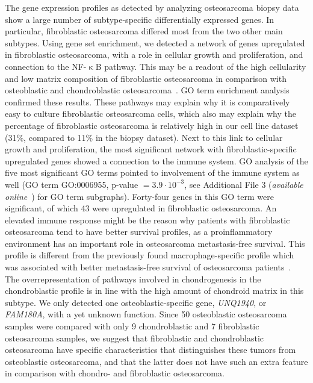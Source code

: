 The gene expression profiles as detected by analyzing
osteosarcoma biopsy data show a large number of subtype\hyp{}specific differentially expressed genes. In particular,
fibroblastic osteosarcoma differed most from the two
other main subtypes. Using gene set enrichment, we
detected a network of genes upregulated in fibroblastic
osteosarcoma, with a role in cellular growth and proliferation,
and connection to the NF-$\upkappa$B pathway. This
may be a readout of the high cellularity and low matrix
composition of fibroblastic osteosarcoma in comparison
with osteoblastic and chondroblastic osteosarcoma~\cite{raymond2002conventional}.
GO term enrichment analysis confirmed these results.
These pathways may explain why it is comparatively
easy to culture fibroblastic osteosarcoma cells, which
also may explain why the percentage of fibroblastic
osteosarcoma is relatively high in our cell line dataset
(31\%, compared to 11\% in the biopsy dataset). Next to
this link to cellular growth and proliferation, the most
significant network with fibroblastic\hyp{}specific upregulated
genes showed a connection to the immune system. GO
analysis of the five most significant GO terms pointed
to involvement of the immune system as well (GO term
GO:0006955, p-value $=3.9\cdot10^{-3}$, see Additional File 3 ({\it available online}~\cite{ch3additional}) for GO
term subgraphs). Forty\hyp{}four genes in this GO term were
significant, of which 43 were upregulated in fibroblastic
osteosarcoma. An elevated immune response might be
the reason why patients with fibroblastic osteosarcoma
tend to have better survival profiles, as a proinflammatory
environment has an important role in osteosarcoma
metastasis\hyp{}free survival. This profile is different from the
previously found macrophage\hyp{}specific profile which was
associated with better metastasis\hyp{}free survival of osteosarcoma
patients~\cite{buddingh2011tumor}. The overrepresentation of pathways
involved in chondrogenesis in the chondroblastic
profile is in line with the high amount of chondroid
matrix in this subtype. We only detected one osteoblastic\hyp{}specific gene, {\it UNQ1940}, or {\it FAM180A}, with a yet
unknown function. Since 50 osteoblastic osteosarcoma
samples were compared with only 9 chondroblastic and
7 fibroblastic osteosarcoma samples, we suggest that
fibroblastic and chondroblastic osteosarcoma have specific
characteristics that distinguishes these tumors from
osteoblastic osteosarcoma, and that the latter does not
have such an extra feature in comparison with chondro- and
fibroblastic osteosarcoma.

